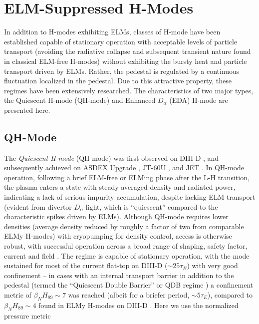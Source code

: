 \section{ELM-Suppressed H-Modes}\label{sec:hcr_elmsuppressed}

In addition to H-modes exhibiting ELMs, classes of H-mode have been established capable of stationary operation with acceptable levels of particle transport (avoiding the radiative collapse and subsequent transient nature found in classical ELM-free H-modes) without exhibiting the bursty heat and particle transport driven by ELMs.  Rather, the pedestal is regulated by a continuous fluctuation localized in the pedestal.  Due to this attractive property, these regimes have been extensively researched.  The characteristics of two major types, the Quiescent H-mode (QH-mode) and Enhanced $D_\alpha$ (EDA) H-mode are presented here.

\subsection{QH-Mode}\label{subsec:hcr_qh}

The \emph{Quiescent H-mode} (QH-mode) was first observed on DIII-D \cite{Burrell2002,Groebner2001}, and subsequently achieved on ASDEX Upgrade \cite{Suttrop2003a}, JT-60U \cite{Sakamoto2004}, and JET \cite{Suttrop2005}.  In QH-mode operation, following a brief ELM-free or ELMing phase after the L-H transition, the plasma enters a state with steady averaged density and radiated power, indicating a lack of serious impurity accumulation, despite lacking ELM transport (evident from divertor $D_\alpha$ light, which is ``quiescent'' compared to the characteristic spikes driven by ELMs).  Although QH-mode requires lower densities (average density reduced by roughly a factor of two from comparable ELMy H-modes) with cryopumping for density control, access is otherwise robust, with successful operation across a broad range of shaping, safety factor, current and field \cite{Burrell2002}.  The regime is capable of stationary operation, with the mode sustained for most of the current flat-top on DIII-D ($\sim 25 \tau_E$)
 with very good confinement -- in cases with an internal transport barrier in addition to the pedestal (termed the ``Quiescent Double Barrier'' or QDB regime \cite{Burrell2001,Doyle2001,Greenfield2002}) a confinement metric of $\beta_N H_{89} \sim 7$ was reached (albeit for a briefer period, $\sim 5 \tau_E$), compared to $\beta_N H_{89} \sim 4$ found in ELMy H-modes on DIII-D \cite{Doyle2001}.  Here we use the normalized pressure metric \cite{Troyon1984}

